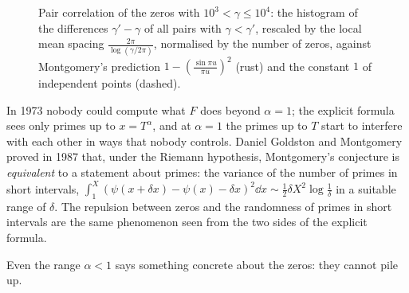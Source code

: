 \begin{figure}[ht]
\centering
{}
\caption{Pair correlation of the zeros with $10^3<\gamma\le10^4$: the histogram of the differences $\gamma'-\gamma$ of all pairs with $\gamma<\gamma'$, rescaled by the local mean spacing $\frac{2\pi}{\log(\gamma/2\pi)}$, normalised by the number of zeros, against Montgomery's prediction $1-(\frac{\sin\pi u}{\pi u})^2$ (rust) and the constant $1$ of independent points (dashed).}
\label{fig:paircorr}
\end{figure}

\begin{beauty}
In 1973 nobody could compute what $F$ does beyond $\alpha=1$; the explicit formula sees only primes up to $x=T^\alpha$, and at $\alpha=1$ the primes up to $T$ start to interfere with each other in ways that nobody controls. Daniel Goldston and Montgomery proved in 1987 that, under the Riemann hypothesis, Montgomery's conjecture is \emph{equivalent} to a statement about primes: the variance of the number of primes in short intervals, $\int_1^X(\psi(x+\delta x)-\psi(x)-\delta x)^2\dd x\sim\frac12\delta X^2\log\frac1\delta$ in a suitable range of $\delta$. The repulsion between zeros and the randomness of primes in short intervals are the same phenomenon seen from the two sides of the explicit formula.
\end{beauty}

Even the range $\alpha<1$ says something concrete about the zeros: they cannot pile up.

